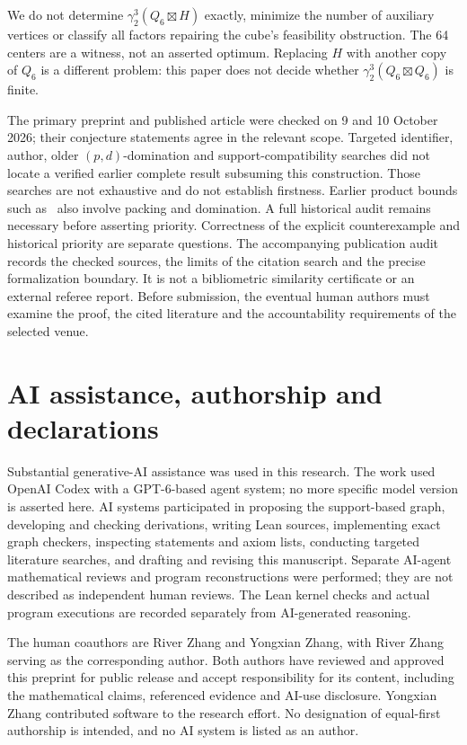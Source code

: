 \documentclass[11pt]{article}
\theoremstyle{definition}
\theoremstyle{remark}
\begin{document}
We do not determine \(\gamma_2^3(Q_6\boxtimes H)\) exactly,
minimize the number of auxiliary vertices or classify all
factors repairing the cube's feasibility obstruction.
The 64 centers are a witness, not an asserted optimum.
Replacing \(H\) with another copy of \(Q_6\) is a different
problem: this paper does not decide whether
\(\gamma_2^3(Q_6\boxtimes Q_6)\) is finite.

The primary preprint and published article were checked on
9 and 10 October 2026; their conjecture statements agree in the
relevant scope. Targeted identifier, author, older
\((p,d)\)-domination and support-compatibility searches did
not locate a verified earlier complete result subsuming this
construction. Those searches are not exhaustive and do not
establish firstness. Earlier product bounds such
as~\cite{fisher} also involve packing and domination.
A full historical audit remains necessary before asserting
priority. Correctness of the explicit counterexample and
historical priority are separate questions.
The accompanying publication audit records the checked sources,
the limits of the citation search and the precise formalization
boundary. It is not a bibliometric similarity certificate or an
external referee report. Before submission, the eventual human
authors must examine the proof, the cited literature and the
accountability requirements of the selected venue.

\section{AI assistance, authorship and declarations}\label{sec:disclosure}
Substantial generative-AI assistance was used in this research.
The work used OpenAI Codex with a GPT-6-based agent system;
no more specific model version is asserted here.
AI systems participated in proposing the support-based graph,
developing and checking derivations, writing Lean sources,
implementing exact graph checkers, inspecting statements and
axiom lists, conducting targeted literature searches, and
drafting and revising this manuscript. Separate AI-agent
mathematical reviews and program reconstructions were performed;
they are not described as independent human reviews.
The Lean kernel checks and actual program executions are
recorded separately from AI-generated reasoning.

The human coauthors are River Zhang and Yongxian Zhang, with
River Zhang serving as the corresponding author. Both authors
have reviewed and approved this preprint for public release and
accept responsibility for its content, including the mathematical
claims, referenced evidence and AI-use disclosure. Yongxian Zhang
contributed software to the research effort. No designation of
equal-first authorship is intended, and no AI system is listed
as an author.
\end{document}
